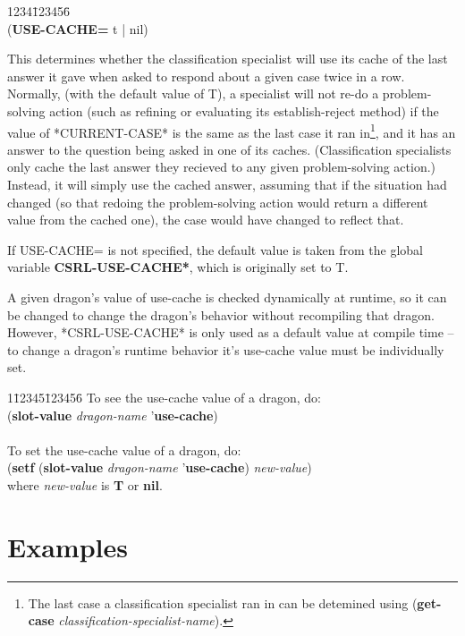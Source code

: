 \begin{tabbing}
1234\=123456\= \kill
\\
({\bf USE-CACHE=} t | nil) \\
\end{tabbing}
This determines whether the classification specialist will use its
cache of the last answer it gave when asked to respond about a given
case twice in a row. Normally, (with the default value of T), a
specialist will not re-do a problem-solving action (such as refining
or evaluating its establish-reject method) if the value of
*CURRENT-CASE* is the same as the last case it ran in\footnote{The
last case a classification specialist ran in can be detemined using
({\bf get-case} {\it classification-specialist-name\/}).}, and it has
an answer to the question being asked in one of its caches.
(Classification specialists only cache the last answer they recieved
to any given problem-solving action.) Instead, it will simply use the
cached answer, assuming that if the situation had changed (so that
redoing the problem-solving action would return a different value from
the cached one), the case would have changed to reflect that. 

If USE-CACHE= is not specified, the default value is taken from the
global variable {\bf *CSRL-USE-CACHE*}, which is originally set to T.

A given dragon's value of use-cache is checked dynamically at runtime,
so it can be changed to change the dragon's behavior without
recompiling that dragon. However, *CSRL-USE-CACHE* is only used as a
default value at compile time -- to change a dragon's runtime behavior
it's use-cache value must be individually set.

\begin{tabbing}
1\=12345\=123456\= \kill
\>To see the use-cache value of a dragon, do: \\
\>\>({\bf slot-value} {\it dragon-name} '{\bf use-cache}) \\
\\
\>To set the use-cache value of a dragon, do: \\
\>\>({\bf setf} ({\bf slot-value} {\it dragon-name} '{\bf use-cache}) {\it new-value}) \\
\>where {\it new-value} is {\bf T} or {\bf nil}. \\
\end{tabbing}

\section{Examples}

